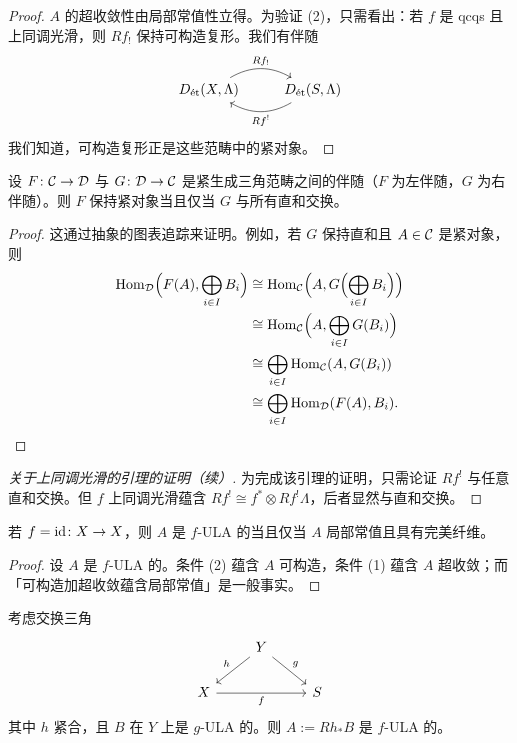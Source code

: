 \begin{proof}
$A$ 的超收敛性由局部常值性立得。为验证 (2)，只需看出：若 $f$ 是 qcqs 且上同调光滑，则 $Rf_!$ 保持可构造复形。我们有伴随
\[
\begin{tikzcd}
D_{\et}(X,\Lambda) \arrow[r, bend left, "Rf_!"] & D_{\et}(S,\Lambda) \arrow[l, bend left, "Rf^!"]
\end{tikzcd}
\]
我们知道，可构造复形正是这些范畴中的紧对象。
\end{proof}

\begin{lemma}
设 $F\colon\mathcal{C}\to\mathcal{D}$ 与 $G\colon\mathcal{D}\to\mathcal{C}$ 是紧生成三角范畴之间的伴随（$F$ 为左伴随，$G$ 为右伴随）。则 $F$ 保持紧对象当且仅当 $G$ 与所有直和交换。
\end{lemma}

\begin{proof}
这通过抽象的图表追踪来证明。例如，若 $G$ 保持直和且 $A\in\mathcal{C}$ 是紧对象，则
\begin{align*}
\operatorname{Hom}_{\mathcal{D}}\Bigl(F(A),\bigoplus_{i\in I}B_i\Bigr)
&\cong\operatorname{Hom}_{\mathcal{C}}\Bigl(A,G\Bigl(\bigoplus_{i\in I}B_i\Bigr)\Bigr)\\
&\cong\operatorname{Hom}_{\mathcal{C}}\Bigl(A,\bigoplus_{i\in I}G(B_i)\Bigr)\\
&\cong\bigoplus_{i\in I}\operatorname{Hom}_{\mathcal{C}}(A,G(B_i))\\
&\cong\bigoplus_{i\in I}\operatorname{Hom}_{\mathcal{D}}(F(A),B_i).
\end{align*}
\end{proof}

\begin{proof}[关于上同调光滑的引理的证明（续）]
为完成该引理的证明，只需论证 $Rf^!$ 与任意直和交换。但 $f$ 上同调光滑蕴含 $Rf^!\cong f^*\otimes Rf^!\Lambda$，后者显然与直和交换。
\end{proof}

\begin{lemma}
若 $f=\operatorname{id}\colon X\to X$，则 $A$ 是 $f$-ULA 的当且仅当 $A$ 局部常值且具有完美纤维。
\end{lemma}

\begin{proof}
设 $A$ 是 $f$-ULA 的。条件 (2) 蕴含 $A$ 可构造，条件 (1) 蕴含 $A$ 超收敛；而「可构造加超收敛蕴含局部常值」是一般事实。
\end{proof}

\begin{lemma}
考虑交换三角
\[
\begin{tikzcd}
& Y \arrow[dl, "h"'] \arrow[dr, "g"] & \\
X \arrow[rr, "f"'] & & S
\end{tikzcd}
\]
其中 $h$ 紧合，且 $B$ 在 $Y$ 上是 $g$-ULA 的。则 $A:=Rh_*B$ 是 $f$-ULA 的。
\end{lemma}

